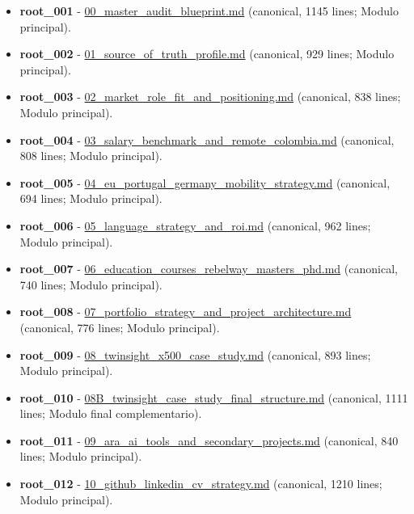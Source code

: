 \begin{itemize}
\item \textbf{root\_001} - \href{file:///E:/Laboral/00_master_audit_blueprint.md}{00\_master\_audit\_blueprint.md} (canonical, 1145 lines; Modulo principal).
\item \textbf{root\_002} - \href{file:///E:/Laboral/01_source_of_truth_profile.md}{01\_source\_of\_truth\_profile.md} (canonical, 929 lines; Modulo principal).
\item \textbf{root\_003} - \href{file:///E:/Laboral/02_market_role_fit_and_positioning.md}{02\_market\_role\_fit\_and\_positioning.md} (canonical, 838 lines; Modulo principal).
\item \textbf{root\_004} - \href{file:///E:/Laboral/03_salary_benchmark_and_remote_colombia.md}{03\_salary\_benchmark\_and\_remote\_colombia.md} (canonical, 808 lines; Modulo principal).
\item \textbf{root\_005} - \href{file:///E:/Laboral/04_eu_portugal_germany_mobility_strategy.md}{04\_eu\_portugal\_germany\_mobility\_strategy.md} (canonical, 694 lines; Modulo principal).
\item \textbf{root\_006} - \href{file:///E:/Laboral/05_language_strategy_and_roi.md}{05\_language\_strategy\_and\_roi.md} (canonical, 962 lines; Modulo principal).
\item \textbf{root\_007} - \href{file:///E:/Laboral/06_education_courses_rebelway_masters_phd.md}{06\_education\_courses\_rebelway\_masters\_phd.md} (canonical, 740 lines; Modulo principal).
\item \textbf{root\_008} - \href{file:///E:/Laboral/07_portfolio_strategy_and_project_architecture.md}{07\_portfolio\_strategy\_and\_project\_architecture.md} (canonical, 776 lines; Modulo principal).
\item \textbf{root\_009} - \href{file:///E:/Laboral/08_twinsight_x500_case_study.md}{08\_twinsight\_x500\_case\_study.md} (canonical, 893 lines; Modulo principal).
\item \textbf{root\_010} - \href{file:///E:/Laboral/08B_twinsight_case_study_final_structure.md}{08B\_twinsight\_case\_study\_final\_structure.md} (canonical, 1111 lines; Modulo final complementario).
\item \textbf{root\_011} - \href{file:///E:/Laboral/09_ara_ai_tools_and_secondary_projects.md}{09\_ara\_ai\_tools\_and\_secondary\_projects.md} (canonical, 840 lines; Modulo principal).
\item \textbf{root\_012} - \href{file:///E:/Laboral/10_github_linkedin_cv_strategy.md}{10\_github\_linkedin\_cv\_strategy.md} (canonical, 1210 lines; Modulo principal).

\end{itemize}

